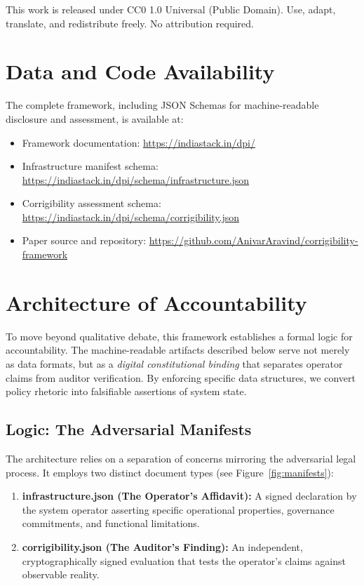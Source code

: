 \documentclass{article}
\begin{document}
This work is released under CC0 1.0 Universal (Public Domain). Use, adapt, translate, and redistribute freely. No attribution required.

\section*{Data and Code Availability}

The complete framework, including JSON Schemas for machine-readable disclosure and assessment, is available at:

\begin{itemize}
    \item Framework documentation: \url{https://indiastack.in/dpi/}
    \item Infrastructure manifest schema: \url{https://indiastack.in/dpi/schema/infrastructure.json}
    \item Corrigibility assessment schema: \url{https://indiastack.in/dpi/schema/corrigibility.json}
    \item Paper source and repository: \url{https://github.com/AnivarAravind/corrigibility-framework}
\end{itemize}

\appendix

\section{Architecture of Accountability}
\label{appendix:architecture}

To move beyond qualitative debate, this framework establishes a formal logic for accountability. The machine-readable artifacts described below serve not merely as data formats, but as a \textit{digital constitutional binding} that separates operator claims from auditor verification. By enforcing specific data structures, we convert policy rhetoric into falsifiable assertions of system state.

\subsection{Logic: The Adversarial Manifests}

The architecture relies on a separation of concerns mirroring the adversarial legal process. It employs two distinct document types (see Figure~\ref{fig:manifests}):

\begin{enumerate}
    \item \textbf{infrastructure.json (The Operator's Affidavit):} A signed declaration by the system operator asserting specific operational properties, governance commitments, and functional limitations.
    \item \textbf{corrigibility.json (The Auditor's Finding):} An independent, cryptographically signed evaluation that tests the operator's claims against observable reality.
\end{enumerate}
\end{document}
